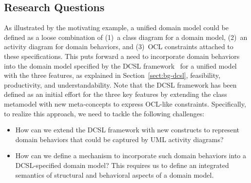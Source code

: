\subsection{Research Questions}

As illustrated by the motivating example, a unified domain model could be defined as a loose combination of (1)~a class diagram for a domain model, (2)~an activity diagram for domain behaviors, and (3)~OCL constraints attached to these specifications. This puts forward a need to incorporate domain behaviors into the domain model specified by the DCSL framework~\cite{le_domain_2018} for a unified model with the three features, as explained in Section~\ref{sect:bg-dcsl}, feasibility, productivity, and understandability. Note that the DCSL framework has been defined as an initial effort for the three key features by extending the class metamodel with new meta-concepts to express OCL-like constraints.
Specifically, to realize this approach, we need to tackle the following challenges:

\begin{itemize}
    \item How can we extend the DCSL framework with new constructs to represent domain behaviors that could be captured by UML activity diagrams?
    \item How can we define a mechanism to incorporate such domain behaviors into a DCSL-specified domain model? This requires us to define an integrated semantics of structural and behavioral aspects of a domain model.
\end{itemize}


